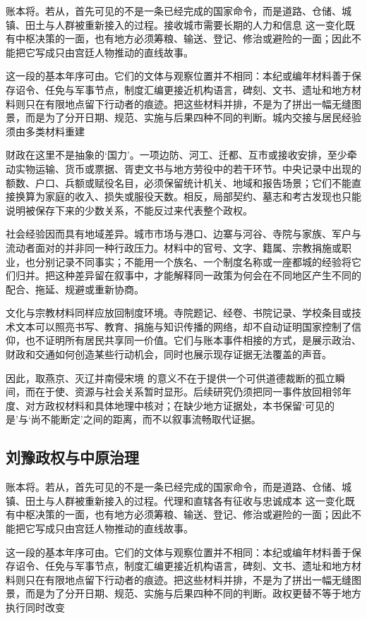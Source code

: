 账本将。若从，首先可见的不是一条已经完成的国家命令，而是道路、仓储、城镇、田土与人群被重新接入的过程。接收城市需要长期的人力和信息 这一变化既有中枢决策的一面，也有地方必须筹粮、输送、登记、修治或避险的一面；因此不能把它写成只由宫廷人物推动的直线故事。

这一段的基本年序可由。它们的文体与观察位置并不相同：本纪或编年材料善于保存诏令、任免与军事节点，制度汇编更接近机构语言，碑刻、文书、遗址和地方材料则只在有限地点留下行动者的痕迹。把这些材料并排，不是为了拼出一幅无缝图景，而是为了分开日期、规范、实施与后果四种不同的判断。城内交接与居民经验须由多类材料重建

财政在这里不是抽象的‘国力’。一项边防、河工、迁都、互市或接收安排，至少牵动实物运输、货币或票据、胥吏文书与地方劳役中的若干环节。中央记录中出现的额数、户口、兵额或赋役名目，必须保留统计机关、地域和报告场景；它们不能直接换算为家庭的收入、损失或服役天数。相反，局部契约、墓志和考古发现也只能说明被保存下来的少数关系，不能反过来代表整个政权。

社会经验因而具有地域差异。城市市场与港口、边寨与河谷、寺院与家族、军户与流动者面对的并非同一种行政压力。材料中的官号、文字、籍属、宗教捐施或职业，也分别记录不同事实；不能用一个族名、一个制度名称或一座都城的经验将它们归并。把这种差异留在叙事中，才能解释同一政策为何会在不同地区产生不同的配合、拖延、规避或重新协商。

文化与宗教材料同样应放回制度环境。寺院题记、经卷、书院记录、学校条目或技术文本可以照亮书写、教育、捐施与知识传播的网络，却不自动证明国家控制了信仰，也不证明所有居民共享同一价值。它们与账本事件相接的方式，是展示政治、财政和交通如何创造某些行动机会，同时也展示现存证据无法覆盖的声音。

因此，取燕京、灭辽并南侵宋境 的意义不在于提供一个可供道德裁断的孤立瞬间，而在于使、资源与社会关系暂时显形。后续研究仍须把同一事件放回相邻年度、对方政权材料和具体地理中核对；在缺少地方证据处，本书保留‘可见的是’与‘尚不能断定’之间的距离，而不以叙事流畅取代证据。

\subsection{刘豫政权与中原治理}

账本将。若从，首先可见的不是一条已经完成的国家命令，而是道路、仓储、城镇、田土与人群被重新接入的过程。代理和直辖各有征收与忠诚成本 这一变化既有中枢决策的一面，也有地方必须筹粮、输送、登记、修治或避险的一面；因此不能把它写成只由宫廷人物推动的直线故事。

这一段的基本年序可由。它们的文体与观察位置并不相同：本纪或编年材料善于保存诏令、任免与军事节点，制度汇编更接近机构语言，碑刻、文书、遗址和地方材料则只在有限地点留下行动者的痕迹。把这些材料并排，不是为了拼出一幅无缝图景，而是为了分开日期、规范、实施与后果四种不同的判断。政权更替不等于地方执行同时改变

